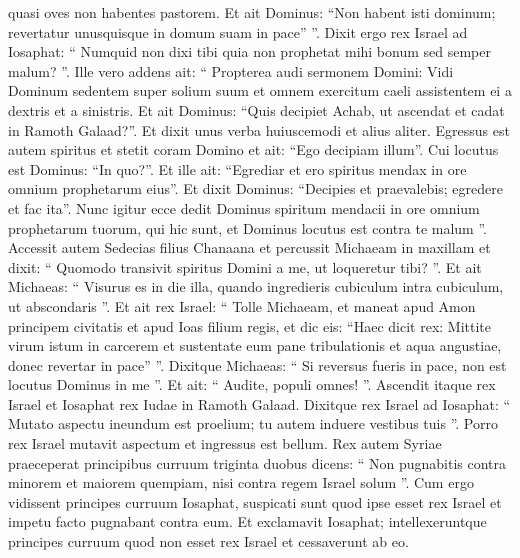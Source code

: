 \begin{biblechapter}
\begin{biblechapter}
\begin{biblechapter}
\begin{biblechapter}
\begin{biblechapter}
\begin{biblechapter}
\begin{biblechapter}
\begin{biblechapter}
\begin{biblechapter}
\begin{biblechapter}
\begin{biblechapter}
\begin{biblechapter}
\begin{biblechapter}
\begin{biblechapter}
\begin{biblechapter}
\begin{biblechapter}
\begin{biblechapter}
\begin{biblechapter}
\begin{biblechapter}
\begin{biblechapter}
\begin{biblechapter}
\begin{biblechapter}
 quasi oves non habentes pastorem. Et ait Dominus: “Non habent isti dominum; revertatur unusquisque in domum suam in pace” ”.
 \verse Dixit ergo rex Israel ad Iosaphat: “ Numquid non dixi tibi quia non prophetat mihi bonum sed semper malum? ”.
 \verse Ille vero addens ait: “ Propterea audi sermonem Domini: Vidi Dominum sedentem super solium suum et omnem exercitum caeli assistentem ei a dextris et a sinistris. 
\verse Et ait Dominus: “Quis decipiet Achab, ut ascendat et cadat in Ramoth Galaad?”. Et dixit unus verba huiuscemodi et alius aliter. 
\verse Egressus est autem spiritus et stetit coram Domino et ait: “Ego decipiam illum”. Cui locutus est Dominus: “In quo?”. 
\verse Et ille ait: “Egrediar et ero spiritus mendax in ore omnium prophetarum eius”. Et dixit Dominus: “Decipies et praevalebis; egredere et fac ita”. 
\verse Nunc igitur ecce dedit Dominus spiritum mendacii in ore omnium prophetarum tuorum, qui hic sunt, et Dominus locutus est contra te malum ”.
 \verse Accessit autem Sedecias filius Chanaana et percussit Michaeam in maxillam et dixit: “ Quomodo transivit spiritus Domini a me, ut loqueretur tibi? ”. 
\verse Et ait Michaeas: “ Visurus es in die illa, quando ingredieris cubiculum intra cubiculum, ut abscondaris ”. 
\verse Et ait rex Israel: “ Tolle Michaeam, et maneat apud Amon principem civitatis et apud Ioas filium regis, 
\verse et dic eis: “Haec dicit rex: Mittite virum istum in carcerem et sustentate eum pane tribulationis et aqua angustiae, donec revertar in pace” ”. 
\verse Dixitque Michaeas: “ Si reversus fueris in pace, non est locutus Dominus in me ”. Et ait: “ Audite, populi omnes! ”.
 \verse Ascendit itaque rex Israel et Iosaphat rex Iudae in Ramoth Galaad. 
\verse Dixitque rex Israel ad Iosaphat: “ Mutato aspectu ineundum est proelium; tu autem induere vestibus tuis ”. Porro rex Israel mutavit aspectum et ingressus est bellum. 
\verse Rex autem Syriae praeceperat principibus curruum triginta duobus dicens: “ Non pugnabitis contra minorem et maiorem quempiam, nisi contra regem Israel solum ”. 
\verse Cum ergo vidissent principes curruum Iosaphat, suspicati sunt quod ipse esset rex Israel et impetu facto pugnabant contra eum. Et exclamavit Iosaphat; 
\verse intellexeruntque principes curruum quod non esset rex Israel et cessaverunt ab eo.

\end{biblechapter}
\end{biblechapter}
\end{biblechapter}
\end{biblechapter}
\end{biblechapter}
\end{biblechapter}
\end{biblechapter}
\end{biblechapter}
\end{biblechapter}
\end{biblechapter}
\end{biblechapter}
\end{biblechapter}
\end{biblechapter}
\end{biblechapter}
\end{biblechapter}
\end{biblechapter}
\end{biblechapter}
\end{biblechapter}
\end{biblechapter}
\end{biblechapter}
\end{biblechapter}
\end{biblechapter}
